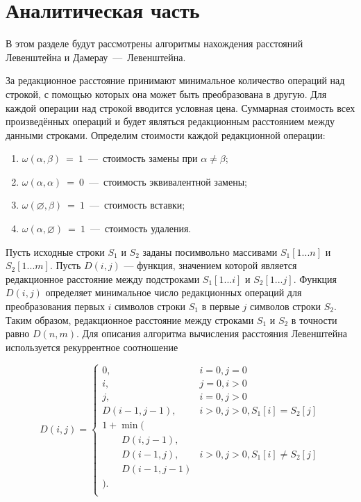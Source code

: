 \section{Аналитическая часть}

В этом разделе будут рассмотрены алгоритмы нахождения расстояний Левенштейна и Дамерау~---~Левенштейна. 
 
За редакционное расстояние принимают минимальное количество операций над строкой, с помощью которых она может быть преобразована в другую. Для каждой операции над строкой вводится условная цена. Суммарная стоимость всех произведённых операций и будет являться редакционным расстоянием между данными строками. Определим стоимости каждой редакционной операции:

\begin{enumerate}
	\item $\omega(\alpha,\beta)~=~1$~---~стоимость замены при $\alpha \neq \beta$;
	\item $\omega(\alpha,\alpha)~=~0$~---~стоимость эквивалентной замены;
	\item $\omega(\varnothing,\beta)~=~1$~---~стоимость вставки;
	\item $\omega(\alpha,\varnothing)~=~1$~---~стоимость удаления.
\end{enumerate}

Пусть исходные строки \(S_1\) и \(S_2\) заданы посимвольно массивами \(S_1[1...n]\) и \(S_2[1...m]\). Пусть \(D(i, j)\) --- функция, значением которой является редакционное расстояние между подстроками \(S_1[1...i]\) и \(S_2[1...j]\). Функция \(D(i, j)\) определяет минимальное число редакционных операций для преобразования первых \(i\) символов строки \(S_1\) в первые \(j\) символов строки \(S_2\). Таким образом, редакционное расстояние между строками \(S_1\) и \(S_2\) в точности равно  \(D(n, m)\). Для описания алгоритма вычисления расстояния Левенштейна используется рекуррентное соотношение

\begin{equation}
\label{eq:lev_formula}
    D(i, j) = \begin{cases}
        0, & i = 0, j = 0\\
        i, & j = 0, i > 0\\
        j, & i = 0, j > 0\\
        D(i-1, j-1), & i > 0, j > 0, S_1[i] = S_2[j]\\
        1 + \min (\\
            \qquad D(i, j-1),\\
            \qquad D(i-1, j), & i > 0, j > 0, S_1[i] \neq S_2[j]\\
            \qquad D(i-1, j-1)\\
            ).\\
    \end{cases}
\end{equation}

